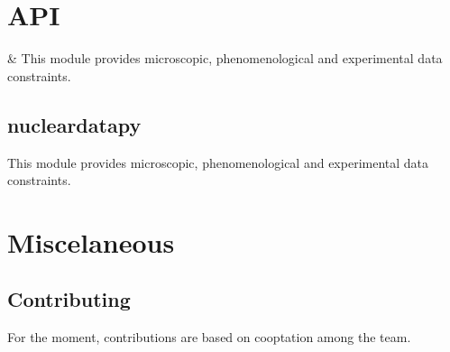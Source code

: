 \documentclass[letterpaper,10pt,english]{sphinxmanual}
\begin{document}
\sphinxstepscope


\section{API}
\label{\detokenize{source/api:api}}\label{\detokenize{source/api::doc}}

\begin{savenotes}\sphinxattablestart
\centering
\begin{tabulary}{\linewidth}[t]{}
\hline

\sphinxAtStartPar
{\hyperref[\detokenize{source/generated/nucleardatapy:module-nucleardatapy}]{}}
&
\sphinxAtStartPar
This module provides microscopic, phenomenological and experimental data constraints.
\\
\hline
\end{tabulary}
\par
\sphinxattableend\end{savenotes}

\sphinxstepscope


\subsection{nucleardatapy}
\label{\detokenize{source/generated/nucleardatapy:module-nucleardatapy}}\label{\detokenize{source/generated/nucleardatapy:nucleardatapy}}\label{\detokenize{source/generated/nucleardatapy::doc}}
\sphinxAtStartPar
This module provides microscopic, phenomenological and experimental data constraints.

\sphinxstepscope


\section{Miscelaneous}
\label{\detokenize{source/miscelaneous:miscelaneous}}\label{\detokenize{source/miscelaneous::doc}}

\subsection{Contributing}
\label{\detokenize{source/miscelaneous:contributing}}\label{\detokenize{source/miscelaneous:id1}}
\sphinxAtStartPar
For the moment, contributions are based on co\sphinxhyphen{}optation among the team.
\end{document}
